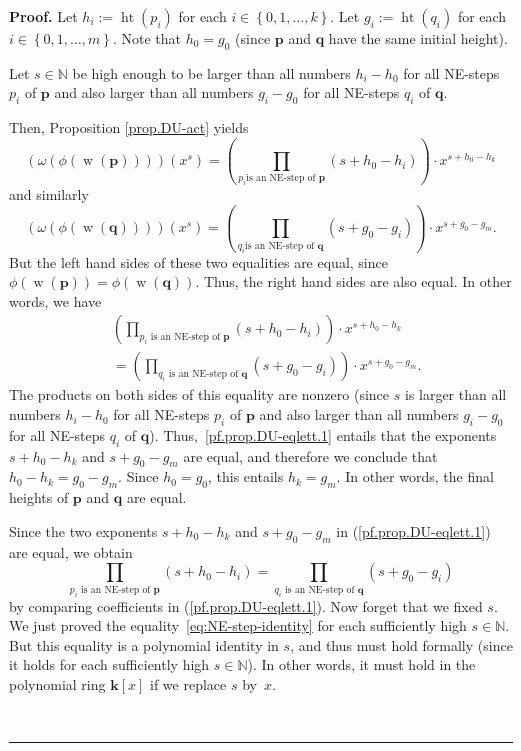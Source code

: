 \documentclass[numbers=enddot,12pt,final,onecolumn,notitlepage]{scrartcl}%
\theoremstyle{definition}
\newenvironment{proof}[1][Proof]{\noindent\textbf{#1.} }{\ \rule{0.5em}{0.5em}}
\newcommand{\kk}{\mathbf{k}}
\newcommand{\NN}{\mathbb{N}}
\newcommand{\pp}{\mathbf{p}}
\newcommand{\qq}{\mathbf{q}}
\newcommand{\w}{\operatorname{w}}
\newcommand{\htt}{\operatorname{ht}}
\newenvironment{vershort}{}{}
\begin{document}
\begin{vershort}
\begin{proof}
Let $h_{i}:=\htt\left(  p_{i}\right)  $ for each $i\in\left\{
0,1,\ldots,k\right\}  $. Let $g_{i}:=\htt\left(  q_{i}\right)  $
for each $i\in\left\{  0,1,\ldots,m\right\}  $. Note that $h_{0}=g_{0}$ (since
$\pp$ and $\qq$ have the same initial height).

Let $s\in\NN$ be high enough to be larger than all numbers $h_{i}%
-h_{0}$ for all NE-steps $p_{i}$ of $\pp$ and also larger than all
numbers $g_{i}-g_{0}$ for all NE-steps $q_{i}$ of $\qq$.

Then, Proposition \ref{prop.DU-act} yields
\[
\left(  \omega\left(  \phi\left(  \w\left(  \pp\right)
\right)  \right)  \right)  \left(  x^{s}\right)  =\left(  \prod_{p_{i}\text{
is an NE-step of }\pp}\left(  s+h_{0}-h_{i}\right)  \right)  \cdot
x^{s+h_{0}-h_{k}}%
\]
and similarly%
\[
\left(  \omega\left(  \phi\left(  \w\left(  \qq\right)
\right)  \right)  \right)  \left(  x^{s}\right)  =\left(  \prod_{q_{i}\text{
is an NE-step of }\qq}\left(  s+g_{0}-g_{i}\right)  \right)  \cdot
x^{s+g_{0}-g_{m}}.
\]
But the left hand sides of these two equalities are equal, since $\phi\left(
\w\left(  \pp\right)  \right)  =\phi\left(
\w\left(  \qq\right)  \right)  $. Thus, the right hand
sides are also equal. In other words, we have%
\begin{align}
& \left(  \prod_{p_{i}\text{ is an NE-step of }\pp}\left(
s+h_{0}-h_{i}\right)  \right)  \cdot x^{s+h_{0}-h_{k}}\nonumber\\
& =\left(  \prod_{q_{i}\text{ is an NE-step of }\qq}\left(
s+g_{0}-g_{i}\right)  \right)  \cdot x^{s+g_{0}-g_{m}}%
.\label{pf.prop.DU-eqlett.1}%
\end{align}
The products on both sides of this equality are nonzero (since $s$ is larger
than all numbers $h_{i}-h_{0}$ for all NE-steps $p_{i}$ of $\pp$ and
also larger than all numbers $g_{i}-g_{0}$ for all NE-steps $q_{i}$ of
$\qq$). Thus,~\eqref{pf.prop.DU-eqlett.1} entails that the exponents $s+h_{0}-h_{k}$ and
$s+g_{0}-g_{m}$ are equal, and therefore we conclude that $h_{0}-h_{k}%
=g_{0}-g_{m}$. Since $h_{0}=g_{0}$, this entails $h_{k}=g_{m}$. In other
words, the final heights of $\pp$ and $\qq$ are equal.

Since the two exponents $s+h_{0}-h_{k}$ and $s+g_{0}-g_{m}$ in
(\ref{pf.prop.DU-eqlett.1}) are equal, we obtain%
\begin{equation}\label{eq:NE-step-identity}
\prod_{p_{i}\text{ is an NE-step of }\pp}\left(  s+h_{0}-h_{i}\right)
=\prod_{q_{i}\text{ is an NE-step of }\qq}\left(  s+g_{0}-g_{i}\right)
\end{equation}
by comparing coefficients in (\ref{pf.prop.DU-eqlett.1}). Now forget that we fixed $s$. 
We just proved the equality~\eqref{eq:NE-step-identity}
for each sufficiently high $s\in\NN$. But this equality is a polynomial
identity in $s$, and thus must hold formally (since it holds for each
sufficiently high $s\in\NN$). In other words, it must hold
in the polynomial ring $\kk\left[  x\right]  $ if we replace $s$ by~$x$.


\end{proof}
\end{vershort}
\end{document}
